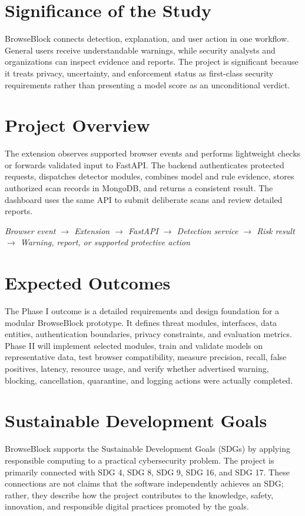 \section{Significance of the Study}
BrowseBlock connects detection, explanation, and user action in one workflow.
General users receive understandable warnings, while security analysts and
organizations can inspect evidence and reports. The project is significant because
it treats privacy, uncertainty, and enforcement status as first-class security
requirements rather than presenting a model score as an unconditional verdict.

\section{Project Overview}
The extension observes supported browser events and performs lightweight checks or
forwards validated input to FastAPI. The backend authenticates protected requests,
dispatches detector modules, combines model and rule evidence, stores authorized
scan records in MongoDB, and returns a consistent result. The dashboard uses the
same API to submit deliberate scans and review detailed reports.

\begin{center}
\textit{Browser event $\rightarrow$ Extension $\rightarrow$ FastAPI
$\rightarrow$ Detection service $\rightarrow$ Risk result $\rightarrow$
Warning, report, or supported protective action}
\end{center}

\section{Expected Outcomes}
The Phase I outcome is a detailed requirements and design foundation for a modular
BrowseBlock prototype. It defines threat modules, interfaces, data entities,
authentication boundaries, privacy constraints, and evaluation metrics. Phase II
will implement selected modules, train and validate models on representative data,
test browser compatibility, measure precision, recall, false positives, latency,
resource usage, and verify whether advertised warning, blocking, cancellation,
quarantine, and logging actions were actually completed.

\section{Sustainable Development Goals}
BrowseBlock supports the Sustainable Development Goals (SDGs) by applying
responsible computing to a practical cybersecurity problem. The project is
primarily connected with SDG 4, SDG 8, SDG 9, SDG 16, and SDG 17. These
connections are not claims that the software independently achieves an SDG;
rather, they describe how the project contributes to the knowledge, safety,
innovation, and responsible digital practices promoted by the goals.

